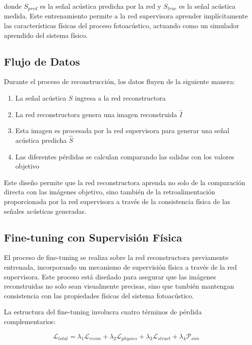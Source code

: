 donde $S_{pred}$ es la señal acústica predicha por la red y $S_{true}$ es la señal acústica medida. Este entrenamiento permite a la red supervisora aprender implícitamente las características físicas del proceso fotoacústico, actuando como un simulador aprendido del sistema físico.

\subsection{Flujo de Datos}

Durante el proceso de reconstrucción, los datos fluyen de la siguiente manera:
\begin{enumerate}
    \item La señal acústica $S$ ingresa a la red reconstructora
    \item La red reconstructora genera una imagen reconstruida $\hat{I}$
    \item Esta imagen es procesada por la red supervisora para generar una señal acústica predicha $\hat{S}$
    \item Las diferentes pérdidas se calculan comparando las salidas con los valores objetivo
\end{enumerate}

Este diseño permite que la red reconstructora aprenda no solo de la comparación directa con las imágenes objetivo, sino también de la retroalimentación proporcionada por la red supervisora a través de la consistencia física de las señales acústicas generadas.

\subsection{Fine-tuning con Supervisión Física}

El proceso de fine-tuning se realiza sobre la red reconstructora previamente entrenada, incorporando un mecanismo de supervisión física a través de la red supervisora. Este proceso está diseñado para asegurar que las imágenes reconstruidas no solo sean visualmente precisas, sino que también mantengan consistencia con las propiedades físicas del sistema fotoacústico.

La estructura del fine-tuning involucra cuatro términos de pérdida complementarios:

\begin{equation}
    \mathcal{L}_{total} = \lambda_{1} \mathcal{L}_{recon} + \lambda_{2} \mathcal{L}_{physics} + \lambda_{3} \mathcal{L}_{struct} + \lambda_{4} \mathcal{P}_{sim}
\end{equation}

